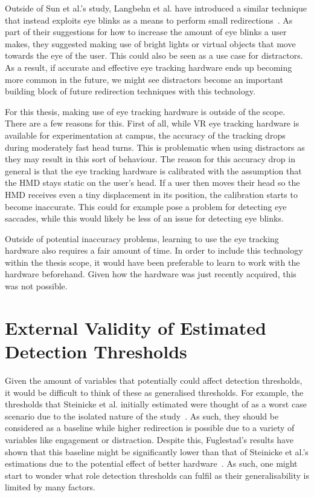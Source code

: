 Outside of Sun et al.'s study, Langbehn et al. have introduced a similar technique that instead exploits eye blinks as a means to perform small redirections~\cite{langbehn2018blink}. As part of their suggestions for how to increase the amount of eye blinks a user makes, they suggested making use of bright lights or virtual objects that move towards the eye of the user. This could also be seen as a use case for distractors. As a result, if accurate and effective eye tracking hardware ends up becoming more common in the future, we might see distractors become an important building block of future redirection techniques with this technology. 

For this thesis, making use of eye tracking hardware is outside of the scope. There are a few reasons for this. First of all, while VR eye tracking hardware is available for experimentation at campus, the accuracy of the tracking drops during moderately fast head turns. This is problematic when using distractors as they may result in this sort of behaviour. The reason for this accuracy drop in general is that the eye tracking hardware is calibrated with the assumption that the HMD stays static on the user's head. If a user then moves their head so the HMD receives even a tiny displacement in its position, the calibration starts to become inaccurate. This could for example pose a problem for detecting eye saccades, while this would likely be less of an issue for detecting eye blinks. 

Outside of potential inaccuracy problems, learning to use the eye tracking hardware also requires a fair amount of time. In order to include this technology within the thesis scope, it would have been preferable to learn to work with the hardware beforehand. Given how the hardware was just recently acquired, this was not possible.

\section{External Validity of Estimated Detection Thresholds}
Given the amount of variables that potentially could affect detection thresholds, it would be difficult to think of these as generalised thresholds. For example, the thresholds that Steinicke et al. initially estimated were thought of as a worst case scenario due to the isolated nature of the study~\cite{5072212}. As such, they should be considered as a baseline while higher redirection is possible due to a variety of variables like engagement or distraction. Despite this, Fuglestad's results have shown that this baseline might be significantly lower than that of Steinicke et al.'s estimations due to the potential effect of better hardware~\cite{fuglestad2018redirected}. As such, one might start to wonder what role detection thresholds can fulfil as their generalisability is limited by many factors.  

